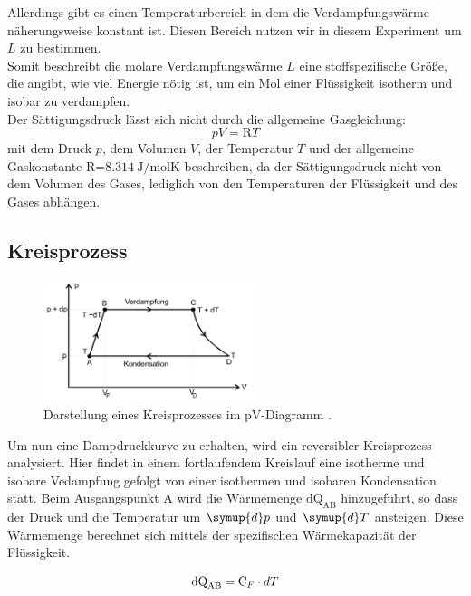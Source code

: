 Allerdings gibt es einen Temperaturbereich in dem die Verdampfungswärme näherungsweise konstant ist.
Diesen Bereich nutzen wir in diesem Experiment um $L$ zu bestimmen.\\
Somit beschreibt die molare Verdampfungswärme $L$ eine stoffspezifische Größe, die angibt, wie viel Energie nötig ist,
um ein Mol einer Flüssigkeit isotherm und isobar zu verdampfen.\\
Der Sättigungsdruck lässt sich nicht durch die allgemeine Gasgleichung:
\begin{equation}
    pV=\text{R}T
    \label{eqn:Gasgl}
\end{equation}
mit dem Druck $p$, dem Volumen $V$, der Temperatur $T$ und der allgemeine Gaskonstante R=$\SI{8.314}{\joule\per\mole\kelvin}$ 
beschreiben, da der Sättigungsdruck nicht von dem Volumen des Gases, lediglich von den Temperaturen der Flüssigkeit 
und des Gases abhängen.
\\

\subsection{Kreisprozess}

\begin{figure}[H]
    \centering
    \includegraphics[width=0.55\textwidth]{images/Kreislauf.PNG}
    \caption{Darstellung eines Kreisprozesses im pV-Diagramm \protect \cite{V203}.}
    \label{img:Kreislauf}
\end{figure}

\noindent Um nun eine Dampdruckkurve zu erhalten, wird ein reversibler Kreisprozess analysiert. Hier findet in einem fortlaufendem 
Kreislauf eine isotherme und isobare Vedampfung gefolgt von einer isothermen und isobaren Kondensation statt.
Beim Ausgangspunkt A wird die Wärmemenge $\text{dQ}_\text{AB} $ hinzugeführt, so dass der Druck und die Temperatur um $\symup{d}p$ und $\symup{d}T$ ansteigen.
Diese Wärmemenge berechnet sich mittels der spezifischen Wärmekapazität der Flüssigkeit.

\begin{equation}
    \text{dQ}_\text{AB}= \text{C}_F \cdot dT \nonumber\\
\end{equation}
\newpage

